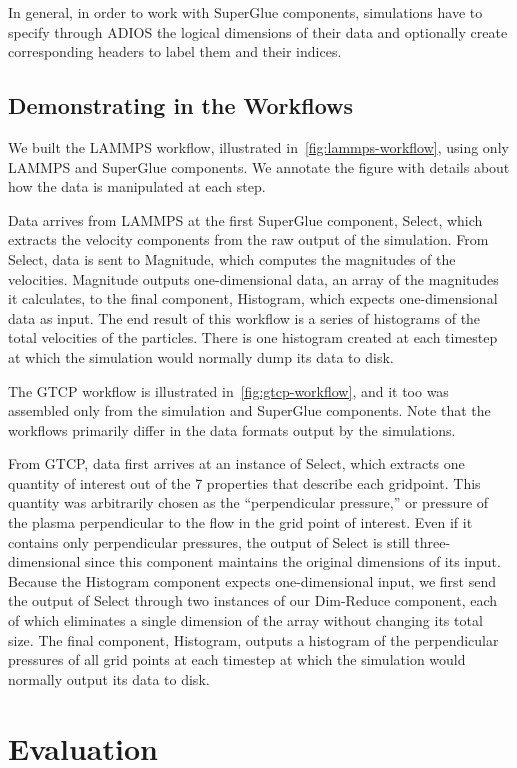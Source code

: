 \documentclass[conference]{IEEEtran}
\begin{document}
In general, in order to work with SuperGlue components, 
simulations have to specify through ADIOS the logical dimensions of their data
and optionally create corresponding headers to label them and their indices.

\subsection{Demonstrating in the Workflows}

We built the LAMMPS workflow, illustrated in~\autoref{fig:lammps-workflow},
using only LAMMPS and SuperGlue components.
We annotate the figure with details about how
the data is manipulated at each step.

Data arrives from LAMMPS at the first SuperGlue component, Select, which
extracts the velocity components from the raw output of the simulation. From
Select, data is sent to Magnitude, which computes
the magnitudes of the velocities. Magnitude
outputs one-dimensional data, an array of the magnitudes it calculates, to the
final component, Histogram, which expects one-dimensional data as input. The
end result of this workflow is a series of histograms of the total velocities
of the particles. There is one histogram created at each timestep at which the
simulation would normally dump its data to disk.


The GTCP workflow is illustrated in~\autoref{fig:gtcp-workflow}, and it too was assembled only from the
simulation and SuperGlue components. Note that the workflows primarily differ
in the data formats output by the simulations.

From GTCP, data first arrives at an instance of Select, which extracts
one quantity of interest out of the 7 properties that describe each gridpoint.
This quantity was arbitrarily chosen as the ``perpendicular
pressure,'' or pressure of the plasma perpendicular to the flow in the grid
point of interest. Even if it contains only perpendicular pressures, the output
of Select is still three-dimensional since this component maintains the
original dimensions of its input. Because the Histogram component expects
one-dimensional input, we first send the output of Select through two instances
of our Dim-Reduce component, each of which eliminates a single dimension of the
array without changing its total size. The final component, Histogram, outputs
a histogram of the perpendicular pressures of all grid points at each timestep
at which the simulation would normally output its data to disk.

\section{Evaluation}
\label{s:eval}
\end{document}
